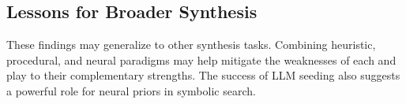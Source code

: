 \subsection{Lessons for Broader Synthesis}

\indent\indent These findings may generalize to other synthesis tasks. Combining heuristic, procedural, and neural paradigms may help mitigate the weaknesses of each and play to their complementary strengths. The success of LLM seeding also suggests a powerful role for neural priors in symbolic search.

\vspace{2em}


